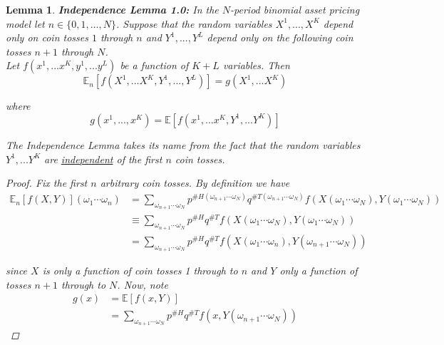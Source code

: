 \documentclass[12pt]{article}
\newtheorem{lemma}{Lemma}
\newlength\tindent
\renewcommand{\indent}{\hspace*{\tindent}}
\newcommand{\E}{\mathbb E}
\begin{document}
\begin{lemma} {\bf Independence Lemma 1.0:} In the $N$-period binomial asset pricing model let $n \in \{0, 1, ..., N\}$. Suppose that the random variables $X^1, ..., X^K$ depend only on coin tosses $1$ through $n$ and $Y^1,..., Y^L$ depend only on the following coin tosses $n + 1$ through $N$. \\

Let $f(x^1,...x^K,y^1,...y^L)$ be a function of $K + L$ variables. Then
\begin{equation*}
	\E_n \left[ f(X^1,...X^K,Y^1,...,Y^L) \right] = g(X^1,...X^K)
\end{equation*}

where
\begin{equation*}
	g(x^1,...,x^K) = \E\left[ f(x^1,...x^K,Y^1,...Y^K) \right]
\end{equation*}

\indent The Independence Lemma takes its name from the fact that the random variables $Y^1,...Y^K$ are \underline{independent} of the first $n$ coin tosses.

\begin{proof} %


Fix the first $n$ arbitrary coin tosses. By definition we have
\begin{align*}
	\E_n [f(X, Y)](\omega_1\cdots\omega_n) &= \sum_{\omega_{n + 1}\cdots\omega_N} p^{\#H(\omega_{n + 1}\cdots\omega_N)} q^{\#T(\omega_{n + 1}\cdots\omega_N)} f(X(\omega_1\cdots\omega_N), Y(\omega_1\cdots\omega_N)) \\
	&\equiv \sum_{\omega_{n + 1}\cdots\omega_N} p^{\#H} q^{\#T} f(X(\omega_1\cdots\omega_N),Y(\omega_1\cdots\omega_N)) \\
	&= \sum_{\omega_{n + 1}\cdots\omega_N} p^{\#H} q^{\#T} f(X(\omega_1\cdots\omega_n),Y(\omega_{n + 1}\cdots\omega_N))
\end{align*}

since $X$ is only a function of coin tosses 1 through to $n$ and $Y$ only a function of tosses $n + 1$ through to $N$. Now, note 
\begin{align*}
	g(x) &= \E[f(x,Y)] \\
	&= \sum_{\omega_{n + 1}\cdots\omega_N} p^{\#H}q^{\#T} f(x, Y(\omega_{n + 1}\cdots\omega_N))
\end{align*}


\end{proof}
\end{lemma}
\end{document}
